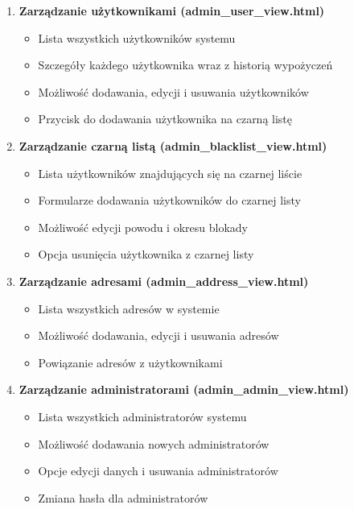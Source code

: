 \documentclass[12pt,a4paper]{article}
\begin{document}
\begin{enumerate}
    \item \textbf{Zarządzanie użytkownikami (admin\_user\_view.html)}
    \begin{itemize}
        \item Lista wszystkich użytkowników systemu
        \item Szczegóły każdego użytkownika wraz z historią wypożyczeń
        \item Możliwość dodawania, edycji i usuwania użytkowników
        \item Przycisk do dodawania użytkownika na czarną listę
    \end{itemize}
    
    \item \textbf{Zarządzanie czarną listą (admin\_blacklist\_view.html)}
    \begin{itemize}
        \item Lista użytkowników znajdujących się na czarnej liście
        \item Formularze dodawania użytkowników do czarnej listy
        \item Możliwość edycji powodu i okresu blokady
        \item Opcja usunięcia użytkownika z czarnej listy
    \end{itemize}
    
    \item \textbf{Zarządzanie adresami (admin\_address\_view.html)}
    \begin{itemize}
        \item Lista wszystkich adresów w systemie
        \item Możliwość dodawania, edycji i usuwania adresów
        \item Powiązanie adresów z użytkownikami
    \end{itemize}
    
    \item \textbf{Zarządzanie administratorami (admin\_admin\_view.html)}
    \begin{itemize}
        \item Lista wszystkich administratorów systemu
        \item Możliwość dodawania nowych administratorów
        \item Opcje edycji danych i usuwania administratorów
        \item Zmiana hasła dla administratorów
    \end{itemize}
\end{enumerate}
\end{document}
